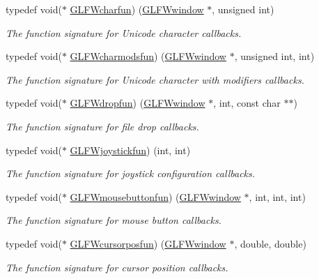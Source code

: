 \begin{DoxyCompactItemize}
typedef void($\ast$ \hyperlink{group__input_gabf24451c7ceb1952bc02b17a0d5c3e5f}{G\+L\+F\+Wcharfun}) (\hyperlink{group__window_ga3c96d80d363e67d13a41b5d1821f3242}{G\+L\+F\+Wwindow} $\ast$, unsigned int)
\begin{DoxyCompactList}\small\item\em The function signature for Unicode character callbacks. \end{DoxyCompactList}\item 
typedef void($\ast$ \hyperlink{group__input_gae36fb6897d2b7df9b128900c8ce9c507}{G\+L\+F\+Wcharmodsfun}) (\hyperlink{group__window_ga3c96d80d363e67d13a41b5d1821f3242}{G\+L\+F\+Wwindow} $\ast$, unsigned int, int)
\begin{DoxyCompactList}\small\item\em The function signature for Unicode character with modifiers callbacks. \end{DoxyCompactList}\item 
typedef void($\ast$ \hyperlink{group__input_gab71f4ca80b651462852e601caf308c4a}{G\+L\+F\+Wdropfun}) (\hyperlink{group__window_ga3c96d80d363e67d13a41b5d1821f3242}{G\+L\+F\+Wwindow} $\ast$, int, const char $\ast$$\ast$)
\begin{DoxyCompactList}\small\item\em The function signature for file drop callbacks. \end{DoxyCompactList}\item 
typedef void($\ast$ \hyperlink{group__input_gaa67aa597e974298c748bfe4fb17d406d}{G\+L\+F\+Wjoystickfun}) (int, int)
\begin{DoxyCompactList}\small\item\em The function signature for joystick configuration callbacks. \end{DoxyCompactList}\item 
typedef void($\ast$ \hyperlink{group__input_ga39893a4a7e7c3239c98d29c9e084350c}{G\+L\+F\+Wmousebuttonfun}) (\hyperlink{group__window_ga3c96d80d363e67d13a41b5d1821f3242}{G\+L\+F\+Wwindow} $\ast$, int, int, int)
\begin{DoxyCompactList}\small\item\em The function signature for mouse button callbacks. \end{DoxyCompactList}\item 
typedef void($\ast$ \hyperlink{group__input_ga4cfad918fa836f09541e7b9acd36686c}{G\+L\+F\+Wcursorposfun}) (\hyperlink{group__window_ga3c96d80d363e67d13a41b5d1821f3242}{G\+L\+F\+Wwindow} $\ast$, double, double)
\begin{DoxyCompactList}\small\item\em The function signature for cursor position callbacks. \end{DoxyCompactList}\item 
$$
\end{DoxyCompactItemize}
